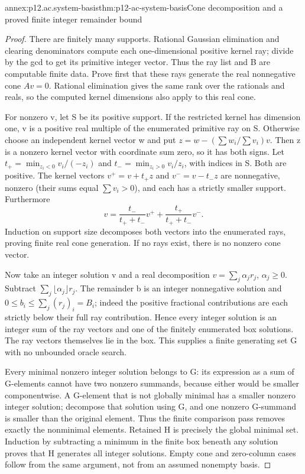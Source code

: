 \begin{annexitem}{annex:p12.ac.system-basis}{thm:p12-ac-system-basis}{Cone decomposition and a proved finite integer remainder bound}
\begin{proof}
There are finitely many supports. Rational Gaussian elimination and
clearing denominators compute each one-dimensional positive kernel
ray; divide by the gcd to get its primitive integer vector. Thus
the ray list and B are computable finite data. Prove first that
these rays generate the real nonnegative cone \(Av=0\).
Rational elimination gives the same rank over the rationals and reals,
so the computed kernel dimensions also apply to this real cone.

For nonzero v, let S be its positive support. If the restricted
kernel has dimension one, v is a positive real multiple of the
enumerated primitive ray on S. Otherwise choose an independent
kernel vector w and put
\(z=w-(\sum w_i/\sum v_i)v\). Then z is a nonzero kernel
vector with coordinate sum zero, so it has both signs. Let
\(t_+=\min_{z_i<0}v_i/(-z_i)\) and
\(t_-=\min_{z_i>0}v_i/z_i\), with indices in S. Both are
positive. The kernel vectors \(v^+=v+t_+z\) and
\(v^-=v-t_-z\) are nonnegative, nonzero (their sums equal
\(\sum v_i>0\)), and each has a strictly smaller support.
Furthermore
\[
 v=\frac{t_-}{t_++t_-}v^+
       +\frac{t_+}{t_++t_-}v^-.
\]
Induction on support size decomposes both vectors into the enumerated
rays, proving finite real cone generation. If no rays exist, there
is no nonzero cone vector.

Now take an integer solution v and a real decomposition
\(v=\sum_j\alpha_jr_j\), \(\alpha_j\geq0\).
Subtract \(\sum_j\lfloor\alpha_j\rfloor r_j\).
The remainder b is an integer nonnegative solution and
\(0\leq b_i\leq\sum_j(r_j)_i=B_i\); indeed the positive
fractional contributions are each strictly below their full ray
contribution. Hence every integer solution is an integer sum of
the ray vectors and one of the finitely enumerated box solutions.
The ray vectors themselves lie in the box. This supplies a finite
generating set G with no unbounded oracle search.

Every minimal nonzero integer solution belongs to G: its expression
as a sum of G-elements cannot have two nonzero summands, because
either would be smaller componentwise. A G-element that is not
globally minimal has a smaller nonzero integer solution; decompose
that solution using G, and one nonzero G-summand is smaller than
the original element. Thus the finite comparison pass removes
exactly the nonminimal elements. Retained H is precisely the
global minimal set. Induction by subtracting a minimum in the
finite box beneath any solution proves that H generates all
integer solutions. Empty cone and zero-column cases follow from
the same argument, not from an assumed nonempty basis.
\end{proof}
\end{annexitem}


